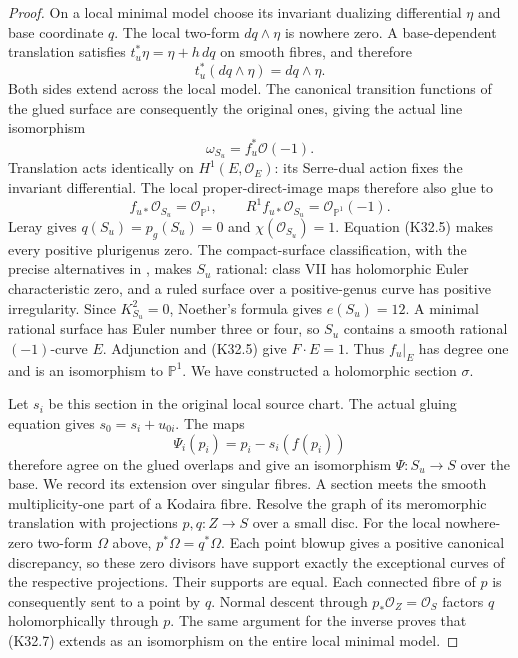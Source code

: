 \begin{proof}
On a local minimal model choose its invariant dualizing
differential $\eta$ and base coordinate $q$. The local
two-form $dq\wedge\eta$ is nowhere zero. A base-dependent
translation satisfies $t_u^*\eta=\eta+h\,dq$ on smooth
fibres, and therefore
\[
             t_u^*(dq\wedge\eta)=dq\wedge\eta.
\]
Both sides extend across the local model. The canonical
transition functions of the glued surface are consequently
the original ones, giving the actual line isomorphism
\[
                    \omega_{S_u}=f_u^*\mathcal O(-1).
                                                               \tag{K32.5}
\]
Translation acts identically on $H^1(E,\mathcal O_E)$:
its Serre-dual action fixes the invariant differential.
The local proper-direct-image maps therefore also glue to
\[
 f_{u*}\mathcal O_{S_u}=\mathcal O_{\mathbb P^1},\qquad
 R^1f_{u*}\mathcal O_{S_u}=\mathcal O_{\mathbb P^1}(-1).
                                                               \tag{K32.6}
\]
Leray gives $q(S_u)=p_g(S_u)=0$ and $\chi(\mathcal O_{S_u})=1$.
Equation (K32.5) makes every positive plurigenus zero.
The compact-surface classification, with the precise alternatives
in \cite[VI.1.1 and Table~10, pp.~243--244]{P4_BHPV2004},
makes $S_u$ rational: class VII has holomorphic Euler
characteristic zero, and a ruled surface over a positive-genus
curve has positive irregularity. Since $K_{S_u}^2=0$,
Noether's formula gives $e(S_u)=12$. A minimal rational
surface has Euler number three or four, so $S_u$ contains
a smooth rational $(-1)$-curve $E$. Adjunction and (K32.5)
give $F\cdot E=1$. Thus $f_u|_E$ has degree one and is
an isomorphism to $\mathbb P^1$. We have constructed a
holomorphic section $\sigma$.

Let $s_i$ be this section in the original local source chart.
The actual gluing equation gives
$s_0=s_i+u_{0i}$. The maps
\[
                 \Psi_i(p_i)=p_i-s_i(f(p_i))            \tag{K32.7}
\]
therefore agree on the glued overlaps and give an isomorphism
$\Psi:S_u\to S$ over the base.
We record its extension over singular fibres. A section
meets the smooth multiplicity-one part of a Kodaira fibre.
Resolve the graph of its meromorphic translation with
projections $p,q:Z\to S$ over a small disc. For the local
nowhere-zero two-form $\Omega$ above, $p^*\Omega=q^*\Omega$.
Each point blowup gives a positive canonical discrepancy,
so these zero divisors have support exactly the exceptional
curves of the respective projections. Their supports are
equal. Each connected fibre of $p$ is consequently sent to
a point by $q$. Normal descent through $p_*\mathcal O_Z
=\mathcal O_S$ factors $q$ holomorphically through $p$.
The same argument for the inverse proves that (K32.7)
extends as an isomorphism on the entire local minimal model.


\end{proof}
